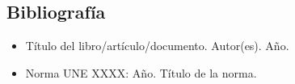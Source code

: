 \documentclass[a4paper,12pt]{article}
\begin{document}
\begin{Form}
\newpage
\section*{Bibliografía}
\begin{itemize}
    \item Título del libro/artículo/documento. Autor(es). Año.
    \item Norma UNE XXXX: Año. Título de la norma.
\end{itemize}

\end{Form}
\end{document}
